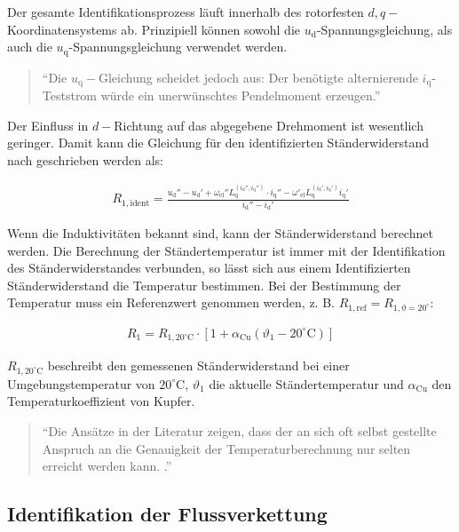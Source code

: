 \documentclass[conference,twocolumn]{IEEEtran}
\newcommand{\x}[1]{\mathrm{#1}}
\begin{document}
Der gesamte Identifikationsprozess läuft innerhalb des rotorfesten $d, q-$Koordinatensystems ab.
Prinzipiell können sowohl die $u_\x{d}$-Spannungsgleichung, als auch die $u_\x{q}$-Spannungsgleichung verwendet werden.

\begin{quote}
\enquote{Die $u_\x{q}-$Gleichung scheidet jedoch aus: Der benötigte alternierende $i_\x{q}$-Teststrom würde ein unerwünschtes Pendelmoment erzeugen.}\autocite[S.~148]{Kellner2012}
\end{quote}

Der Einfluss in $d-$Richtung auf das abgegebene Drehmoment ist wesentlich geringer.
Damit kann die Gleichung für den identifizierten Ständerwiderstand nach \textcite{Kellner2012} geschrieben werden als:

\begin{small}
\begin{align}
R_\x{1,ident} = \frac{u_\x{d}'' - u_\x{d}' + \omega_\x{el}'' L_\x{q}^{(i_\x{d}'',i_\x{q}'')}\cdot i_\x{q}'' - \omega'_\x{el}L_\x{q}^{(i_\x{d}',i_\x{q}')}i_\x{q}'}{i_\x{d}''-i_\x{d}'}
\end{align}
\end{small}

Wenn die Induktivitäten bekannt sind, kann der Ständerwiderstand berechnet werden.
Die Berechnung der Ständertemperatur ist immer mit der Identifikation des Ständerwiderstandes verbunden, so lässt sich aus einem Identifizierten Ständerwiderstand die Temperatur bestimmen.
Bei der Bestimmung der Temperatur muss ein Referenzwert genommen werden, z. B. $R_\x{1,ref} = R_\x{1,\vartheta = 20^{\circ}}$:

\begin{align}
R_\x{1} = R_\x{1,20^{\circ}\x{C}}\cdot \left[ 1 + \alpha_\x{Cu}(\vartheta_\x{1} - 20^{\circ}\x{C})\right]
\end{align}

$R_\x{1,20^{\circ}\x{C}}$ beschreibt den gemessenen Ständerwiderstand bei einer Umgebungstemperatur von $20^{\circ}\x{C}$, $\vartheta_\x{1}$ die aktuelle Ständertemperatur und $\alpha_\x{Cu}$ den Temperaturkoeffizient von Kupfer.

		\begin{quote}
			\enquote{Die Ansätze in der Literatur zeigen, dass der an sich oft selbst gestellte Anspruch an die Genauigkeit der Temperaturberechnung nur selten erreicht werden kann. \autocite[S.~175]{Kellner2012}.}
		\end{quote}

\subsection{Identifikation der Flussverkettung}\label{sec:ident-fluss}
\end{document}
